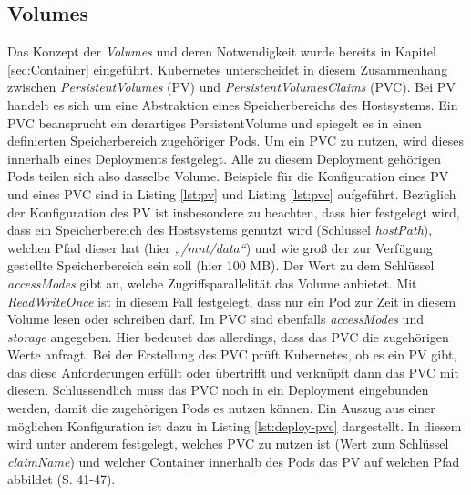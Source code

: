 \documentclass[11pt,a4paper]{article}
\begin{document}
\subsection{Volumes}
Das Konzept der \emph{Volumes} und deren Notwendigkeit wurde bereits in Kapitel \ref{sec:Container} eingeführt.
Kubernetes unterscheidet in diesem Zusammenhang zwischen \emph{PersistentVolumes} (PV) und \emph{PersistentVolumesClaims} (PVC).
Bei PV handelt es sich um eine Abstraktion eines Speicherbereichs des Hostsystems.
Ein PVC beansprucht ein derartiges PersistentVolume und spiegelt es in einen
definierten Speicherbereich zugehöriger Pods. Um ein PVC zu nutzen, wird dieses innerhalb eines Deployments festgelegt.
Alle zu diesem Deployment gehörigen Pods teilen sich also dasselbe Volume.
Beispiele für die Konfiguration eines PV und eines PVC sind in Listing \ref{lst:pv} und Listing \ref{lst:pvc}
aufgeführt. Bezüglich der Konfiguration des PV ist insbesondere zu beachten, dass hier
festgelegt wird, dass ein Speicherbereich des Hostsystems genutzt wird (Schlüssel \emph{hostPath}),
welchen Pfad dieser hat (hier \emph{„/mnt/data“})
und wie groß der zur Verfügung gestellte Speicherbereich sein soll (hier 100 MB).
Der Wert zu dem Schlüssel \emph{accessModes} gibt an, welche Zugriffsparallelität das Volume anbietet.
Mit \emph{ReadWriteOnce} ist in diesem Fall festgelegt, dass nur ein Pod zur Zeit
in diesem Volume lesen oder schreiben darf.
Im PVC sind ebenfalls \emph{accessModes} und \emph{storage} angegeben. Hier
bedeutet das allerdings, dass das PVC die zugehörigen Werte anfragt.
Bei der Erstellung des PVC prüft Kubernetes, ob es ein PV gibt,
das diese Anforderungen erfüllt oder übertrifft und verknüpft dann das PVC mit diesem.
Schlussendlich muss das PVC noch in ein Deployment eingebunden werden, damit die zugehörigen
Pods es nutzen können. Ein Auszug aus einer möglichen Konfiguration ist dazu in
Listing \ref{lst:deploy-pvc} dargestellt. In diesem wird unter anderem festgelegt,
welches PVC zu nutzen ist (Wert zum Schlüssel \emph{claimName}) und welcher Container
innerhalb des Pods das PV auf welchen Pfad abbildet \cite{Schmeling_Dargatz_2022} (S. 41-47).




\end{document}
